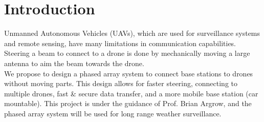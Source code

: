 \documentclass[UROP.tex]{subfiles}
\begin{document}
\bigskip
\section{\Large Introduction}
	Unmanned Autonomous Vehicles (UAVs), which are used for surveillance systems and remote sensing, have many limitations in communication capabilities.  Steering a beam to connect to a drone is done by mechanically moving a large antenna to aim the beam towards the drone.  \\
	
	We propose to design a phased array system to connect base stations to drones without moving parts.  This design allows for faster steering, connecting to multiple drones, fast \& secure data transfer, and a more mobile base station (car mountable).  This project is under the guidance of Prof. Brian Argrow, and the phased array system will be used for long range weather surveillance.
\end{document}
